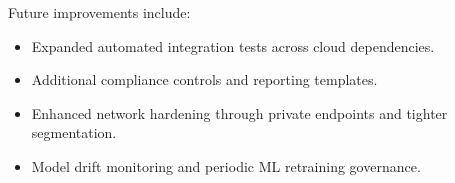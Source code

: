\documentclass[12pt,a4paper]{article}
\begin{document}
Future improvements include:
\begin{itemize}[leftmargin=1.4em]
  \item Expanded automated integration tests across cloud dependencies.
  \item Additional compliance controls and reporting templates.
  \item Enhanced network hardening through private endpoints and tighter segmentation.
  \item Model drift monitoring and periodic ML retraining governance.
\end{itemize}
\end{document}
